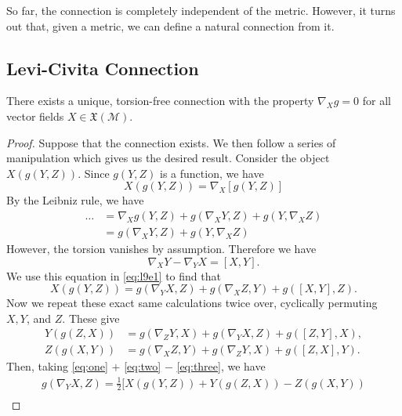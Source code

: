 So far, the connection is completely independent of the metric. However, it turns out that, given a metric, we can define a natural connection from it.

\subsection{Levi-Civita Connection}%
\label{sub:levi_civita_connection}

\begin{theorem}
  There exists a unique, torsion-free connection with the property $\nabla_{X} g = 0$ for all vector fields $X \in \mathfrak{X}(\mathcal{M})$.
\end{theorem}
\begin{proof}
  Suppose that the connection exists.
  We then follow a series of manipulation which gives us the desired result.
  Consider the object $X(g(Y, Z))$. Since $g(Y, Z)$ is a function, we have
  \begin{equation}
    X(g(Y,Z)) = \nabla_{X} [g(Y, Z)]
  \end{equation}
  By the Leibniz rule, we have
  \begin{align}
    \dots &= \nabla_{X} g(Y, Z) + g(\nabla_{X}Y, Z) + g(Y, \nabla_{X}Z) \\
	  &= g(\nabla_{X}Y, Z) + g(Y, \nabla_{X}Z) \label{eq:l9e1}
  \end{align}
  However, the torsion vanishes by assumption. Therefore we have
  \begin{equation}
    \nabla_{X}Y - \nabla_{Y}X = [X, Y].
  \end{equation} 
  We use this equation in \eqref{eq:l9e1} to find that
  \begin{equation}
    \label{eq:one}
    X(g(Y, Z)) = g(\nabla_{Y} X, Z ) + g(\nabla_{X} Z , Y) + g([X, Y], Z).
  \end{equation}
  Now we repeat these exact same calculations twice over, cyclically permuting $X, Y$, and $Z$. These give
  \begin{align}
    \label{eq:two}
    Y(g(Z, X)) &= g(\nabla_{Z} Y, X ) + g(\nabla_{Y} X , Z) + g([Z, Y], X), \\
    \label{eq:three}
    Z(g(X, Y)) &= g(\nabla_{X} Z, Y ) + g(\nabla_{Z} Y , X) + g([Z, X], Y).
  \end{align}
  Then, taking \eqref{eq:one} $+$ \eqref{eq:two} $-$ \eqref{eq:three}, we have
  \begin{multline}
    g(\nabla_{Y}X, Z) = \frac{1}{2} \bigl[ X(g(Y,Z) ) + Y(g(Z, X)) - Z(g(X,Y)) \\

\end{multline}
\end{proof}
